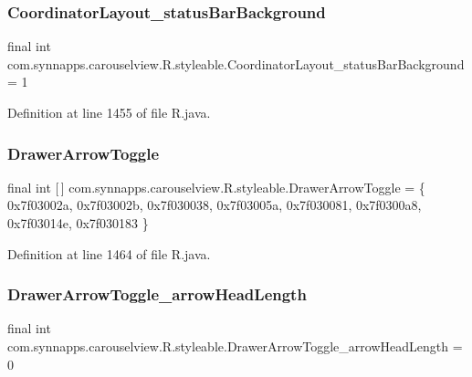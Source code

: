\subsubsection{\texorpdfstring{CoordinatorLayout\_statusBarBackground}{CoordinatorLayout\_statusBarBackground}}
{\footnotesize\ttfamily final int com.\+synnapps.\+carouselview.\+R.\+styleable.\+Coordinator\+Layout\+\_\+status\+Bar\+Background = 1\hspace{0.3cm}{\ttfamily [static]}}



Definition at line 1455 of file R.\+java.

\mbox{\label{classcom_1_1synnapps_1_1carouselview_1_1_r_1_1styleable_a3213350ba13a7d227ba70e2e51f3574f}} 
\subsubsection{\texorpdfstring{DrawerArrowToggle}{DrawerArrowToggle}}
{\footnotesize\ttfamily final int \mbox{[}$\,$\mbox{]} com.\+synnapps.\+carouselview.\+R.\+styleable.\+Drawer\+Arrow\+Toggle = \{ 0x7f03002a, 0x7f03002b, 0x7f030038, 0x7f03005a, 0x7f030081, 0x7f0300a8, 0x7f03014e, 0x7f030183 \}\hspace{0.3cm}{\ttfamily [static]}}



Definition at line 1464 of file R.\+java.

\mbox{\label{classcom_1_1synnapps_1_1carouselview_1_1_r_1_1styleable_a8d0e3621611c8d2158c74c7fd7e0e49b}} 
\subsubsection{\texorpdfstring{DrawerArrowToggle\_arrowHeadLength}{DrawerArrowToggle\_arrowHeadLength}}
{\footnotesize\ttfamily final int com.\+synnapps.\+carouselview.\+R.\+styleable.\+Drawer\+Arrow\+Toggle\+\_\+arrow\+Head\+Length = 0\hspace{0.3cm}{\ttfamily [static]}}



